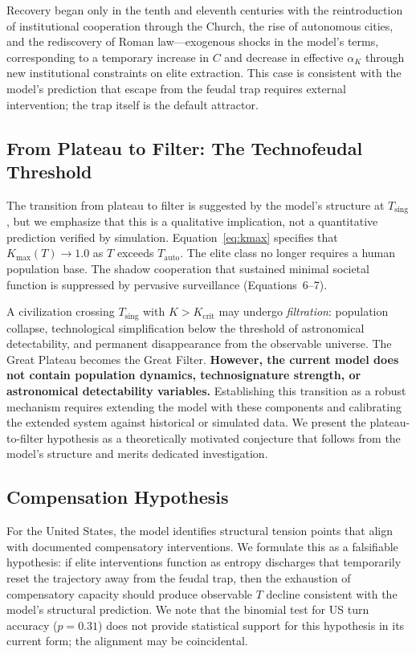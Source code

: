 Recovery began only in the tenth and eleventh centuries with the reintroduction of institutional cooperation through the Church, the rise of autonomous cities, and the rediscovery of Roman law---exogenous shocks in the model's terms, corresponding to a temporary increase in $C$ and decrease in effective $\alpha_K$ through new institutional constraints on elite extraction. This case is consistent with the model's prediction that escape from the feudal trap requires external intervention; the trap itself is the default attractor.

\subsection{From Plateau to Filter: The Technofeudal Threshold}

The transition from plateau to filter is suggested by the model's structure at $T_{\text{sing}}$, but we emphasize that this is a qualitative implication, not a quantitative prediction verified by simulation. Equation~\eqref{eq:kmax} specifies that $K_{\max}(T) \rightarrow 1.0$ as $T$ exceeds $T_{\text{auto}}$. The elite class no longer requires a human population base. The shadow cooperation that sustained minimal societal function is suppressed by pervasive surveillance (Equations~6--7).

A civilization crossing $T_{\text{sing}}$ with $K > K_{\text{crit}}$ may undergo \emph{filtration}: population collapse, technological simplification below the threshold of astronomical detectability, and permanent disappearance from the observable universe. The Great Plateau becomes the Great Filter. \textbf{However, the current model does not contain population dynamics, technosignature strength, or astronomical detectability variables.} Establishing this transition as a robust mechanism requires extending the model with these components and calibrating the extended system against historical or simulated data. We present the plateau-to-filter hypothesis as a theoretically motivated conjecture that follows from the model's structure and merits dedicated investigation.

\subsection{Compensation Hypothesis}

For the United States, the model identifies structural tension points that align with documented compensatory interventions. We formulate this as a falsifiable hypothesis: if elite interventions function as entropy discharges that temporarily reset the trajectory away from the feudal trap, then the exhaustion of compensatory capacity should produce observable $T$ decline consistent with the model's structural prediction. We note that the binomial test for US turn accuracy ($p = 0.31$) does not provide statistical support for this hypothesis in its current form; the alignment may be coincidental.

